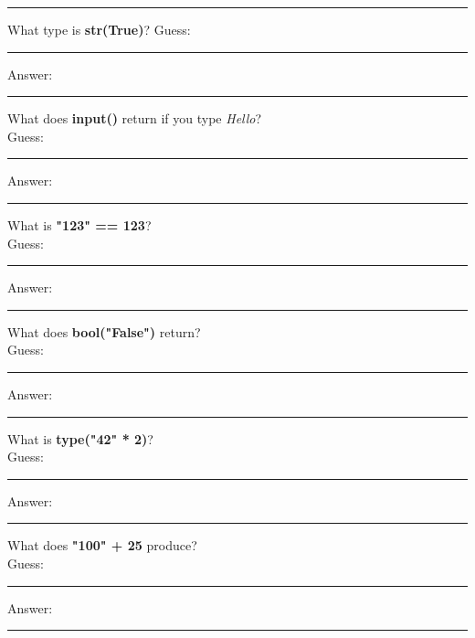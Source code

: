 \documentclass{article}
\begin{document}
\begin{tasks}[
    style=enumerate,
    label-format=\bfseries,
    label-width=1.5em,
    item-indent=2em,
    column-sep=1em,
    after-item-skip=2em
  ]
        \rule{\linewidth}{0.4pt} %

        \task What type is \textbf{str(True)}? 
        Guess:  \vspace{3mm}\\
        \rule{\linewidth}{0.4pt} %
        Answer:  \vspace{3mm}\\

        \rule{\linewidth}{0.4pt} %

        \task What does \textbf{input()} return if you type \textit{Hello}?  \\
        Guess:  \vspace{3mm}\\
        \rule{\linewidth}{0.4pt} %
        Answer:  \vspace{3mm}\\

        \rule{\linewidth}{0.4pt} %

        \task What is \textbf{"123" == 123}?  \\
        Guess:  \vspace{3mm}\\
        \rule{\linewidth}{0.4pt} %
        Answer:  \vspace{3mm}\\
        \rule{\linewidth}{0.4pt} %

        \task What does \textbf{bool("False")} return?  \\
        Guess:  \vspace{3mm}\\
        \rule{\linewidth}{0.4pt} %
        Answer:  \vspace{3mm}\\
        \rule{\linewidth}{0.4pt} %

        \task What is \textbf{type("42" * 2)}?  \\
        Guess:  \vspace{3mm}\\
        \rule{\linewidth}{0.4pt} %
        Answer:  \vspace{3mm}\\
        \rule{\linewidth}{0.4pt} %

        \task What does \textbf{"100" + 25} produce?   \\
        Guess:  \vspace{3mm}\\
        \rule{\linewidth}{0.4pt} %
        Answer:  \vspace{3mm}\\
        \rule{\linewidth}{0.4pt} %


\end{tasks}
\end{document}
